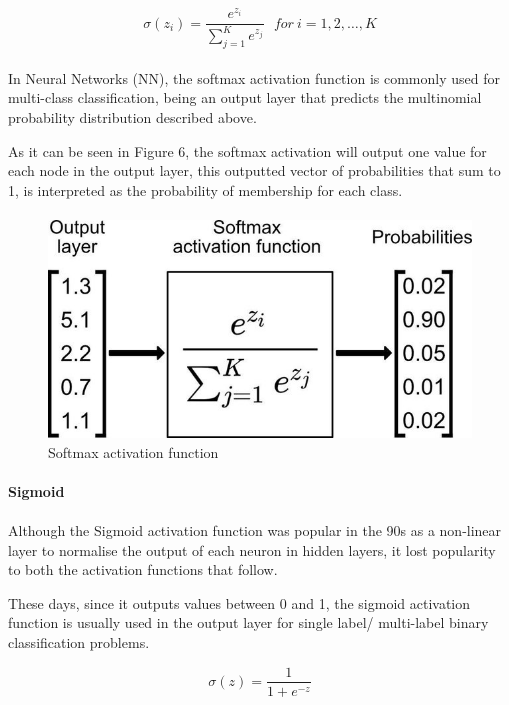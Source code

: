 \documentclass{article}
\begin{document}
\begin{equation}
    \sigma(z_i) = \frac{e^{z_{i}}}{\sum_{j=1}^K e^{z_{j}}} \ \ \ for\ i=1,2,\dots,K
\end{equation}

\paragraph{}
In Neural Networks (NN), the softmax activation function is commonly used for multi-class classification, being an output layer that predicts the multinomial probability distribution described above.

As it can be seen in Figure 6, the softmax activation will output one value for each node in the output layer, this outputted vector of probabilities that sum to 1, is interpreted as the probability of membership for each class.
\paragraph{}
\begin{figure}[hbt!]
    \centering
    \includegraphics[width=0.4\linewidth]{softmaximg.jpg}
    \caption{Softmax activation function \cite{softmaxpic}}
\end{figure}

\paragraph{Sigmoid}
\paragraph{}
Although the Sigmoid activation function was popular in the 90s as a non-linear layer to normalise the output of each neuron in hidden layers, it lost popularity to both the activation functions that follow.

These days, since it outputs values between 0 and 1, the sigmoid activation function is usually used in the output layer for single label/ multi-label binary classification problems. 

\begin{equation}
    \sigma(z) = \frac{1} {1 + e^{-z}}
\end{equation}
\end{document}
